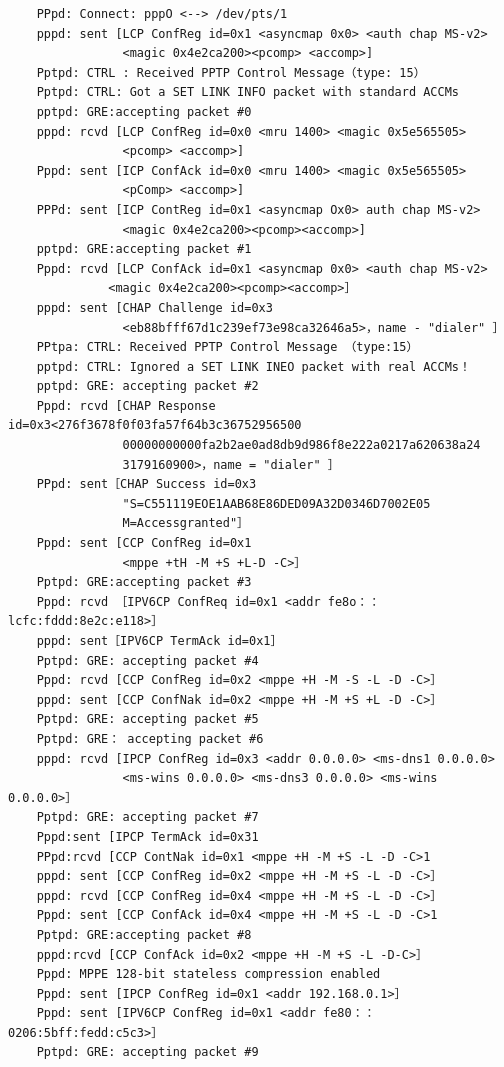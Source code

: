 \begin{verbatim}
    PPpd: Connect: pppO <--> /dev/pts/1
    pppd: sent [LCP ConfReg id=0x1 <asyncmap 0x0> <auth chap MS-v2>
                <magic 0x4e2ca200><pcomp> <accomp>]
    Pptpd: CTRL : Received PPTP Control Message（type: 15）
    Pptpd: CTRL: Got a SET LINK INFO packet with standard ACCMs
    pptpd: GRE:accepting packet #0
    pppd: rcvd [LCP ConfReg id=0x0 <mru 1400> <magic 0x5e565505>
                <pcomp> <accomp>]
    Pppd: sent [ICP ConfAck id=0x0 <mru 1400> <magic 0x5e565505>
                <pComp> <accomp>]
    PPPd: sent [ICP ContReg id=0x1 <asyncmap Ox0> auth chap MS-v2>
                <magic 0x4e2ca200><pcomp><accomp>]
    pptpd: GRE:accepting packet #1
    Pppd: rcvd [LCP ConfAck id=0x1 <asyncmap 0x0> <auth chap MS-v2>
              <magic 0x4e2ca200><pcomp><accomp>］
    pppd: sent [CHAP Challenge id=0x3
                <eb88bfff67d1c239ef73e98ca32646a5>，name - "dialer" ］
    PPtpa: CTRL: Received PPTP Control Message （type:15）
    pptpd: CTRL: Ignored a SET LINK INEO packet with real ACCMs！
    pptpd: GRE: accepting packet #2
    Pppd: rcvd [CHAP Response id=0x3<276f3678f0f03fa57f64b3c36752956500
                00000000000fa2b2ae0ad8db9d986f8e222a0217a620638a24
                3179160900>，name = "dialer" ］
    PPpd: sent［CHAP Success id=0x3
                "S=C551119EOE1AAB68E86DED09A32D0346D7002E05
                M=Accessgranted"］
    Pppd: sent [CCP ConfReg id=0x1
                <mppe +tH -M +S +L-D -C>］
    Pptpd: GRE:accepting packet #3
    Pppd: rcvd ［IPV6CP ConfReq id=0x1 <addr fe8o：：lcfc:fddd:8e2c:e118>］
    pppd: sent［IPV6CP TermAck id=0x1］
    Pptpd: GRE: accepting packet #4
    Pppd: rcvd [CCP ConfReg id=0x2 <mppe +H -M -S -L -D -C>］
    pppd: sent [CCP ConfNak id=0x2 <mppe +H -M +S +L -D -C>］
    Pptpd: GRE: accepting packet #5
    Pptpd: GRE： accepting packet #6
    pppd: rcvd [IPCP ConfReg id=0x3 <addr 0.0.0.0> <ms-dns1 0.0.0.0>
                <ms-wins 0.0.0.0> <ms-dns3 0.0.0.0> <ms-wins 0.0.0.0>］
    Pptpd: GRE: accepting packet #7
    Pppd:sent [IPCP TermAck id=0x31
    PPpd:rcvd [CCP ContNak id=0x1 <mppe +H -M +S -L -D -C>1
    pppd: sent [CCP ConfReg id=0x2 <mppe +H -M +S -L -D -C>］
    pppd: rcvd [CCP ConfReg id=0x4 <mppe +H -M +S -L -D -C>］
    Pppd: sent [CCP ConfAck id=0x4 <mppe +H -M +S -L -D -C>1
    Pptpd: GRE:accepting packet #8
    pppd:rcvd [CCP ConfAck id=0x2 <mppe +H -M +S -L -D-C>］
    Pppd: MPPE 128-bit stateless compression enabled
    Pppd: sent [IPCP ConfReg id=0x1 <addr 192.168.0.1>］
    Pppd: sent [IPV6CP ConfReg id=0x1 <addr fe80：：0206:5bff:fedd:c5c3>］
    Pptpd: GRE: accepting packet #9

\end{verbatim}
